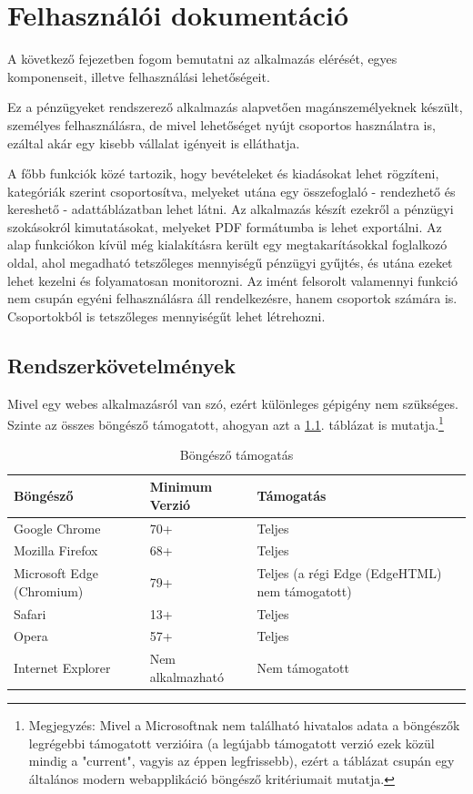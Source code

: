 \chapter{Felhasználói dokumentáció}
\label{ch:user}

A következő fejezetben fogom bemutatni az alkalmazás elérését, egyes komponenseit, illetve felhasználási lehetőségeit. 

Ez a pénzügyeket rendszerező alkalmazás alapvetően magánszemélyeknek készült, személyes felhasználásra, de mivel lehetőséget nyújt csoportos használatra is, ezáltal akár egy kisebb vállalat igényeit is elláthatja.

A főbb funkciók közé tartozik, hogy bevételeket és kiadásokat lehet rögzíteni, kategóriák szerint csoportosítva, melyeket utána egy összefoglaló - rendezhető és kereshető - adattáblázatban lehet látni. Az alkalmazás készít ezekről a pénzügyi szokásokról kimutatásokat, melyeket PDF formátumba is lehet exportálni. Az alap funkciókon kívül még kialakításra került egy megtakarításokkal foglalkozó oldal, ahol megadható tetszőleges mennyiségű pénzügyi gyűjtés, és utána ezeket lehet kezelni és folyamatosan monitorozni. Az imént felsorolt valamennyi funkció nem csupán egyéni felhasználásra áll rendelkezésre, hanem csoportok számára is. Csoportokból is tetszőleges mennyiségűt lehet létrehozni.


\section{Rendszerkövetelmények}

Mivel egy webes alkalmazásról van szó, ezért különleges gépigény nem szükséges. Szinte az összes böngésző támogatott, ahogyan azt a \ref{tab:browsers}. táblázat is mutatja.\footnote{Megjegyzés: Mivel a Microsoftnak nem található hivatalos adata a böngészők legrégebbi támogatott verzióira (a legújabb támogatott verzió ezek közül mindig a "current", vagyis az éppen legfrissebb), ezért a táblázat csupán egy általános modern webapplikáció böngésző kritériumait mutatja.}
\begin{table}[H]
	\centering
	\begin{tabular}{ | m{} | m{} | m{} | }
		\hline
		\textbf{Böngésző} & \textbf{Minimum Verzió} & \textbf{Támogatás} \\
		\hline
		Google Chrome & 70+ & Teljes \\
		\hline
		Mozilla Firefox & 68+ & Teljes \\
		\hline
		Microsoft Edge (Chromium) & 79+ & Teljes (a régi Edge (EdgeHTML) nem támogatott) \\
		\hline
		Safari & 13+ & Teljes \\
		\hline
		Opera & 57+ & Teljes \\
		\hline
		Internet Explorer & Nem alkalmazható & Nem támogatott \\
		\hline
	\end{tabular}
	\caption{Böngésző támogatás}
	\label{tab:browsers}
\end{table}

